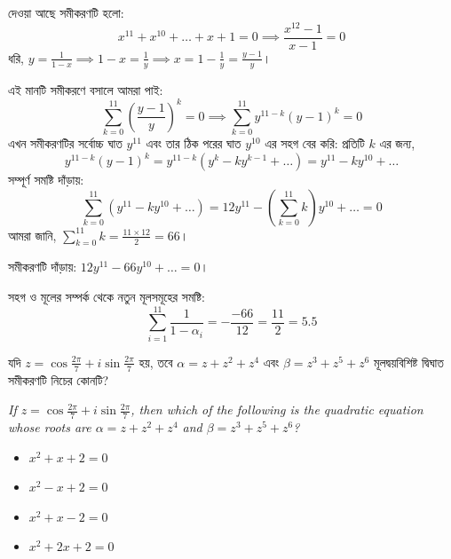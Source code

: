 \documentclass[12pt, a4paper]{article}
\begin{document}
\begin{tcolorbox}[solutionbox={সমাধান (Solution)}]
    \noindent
    দেওয়া আছে সমীকরণটি হলো: 
    \[ x^{11} + x^{10} + \dots + x + 1 = 0 \implies \frac{x^{12}-1}{x-1} = 0 \]
    ধরি, $y = \frac{1}{1-x} \implies 1-x = \frac{1}{y} \implies x = 1 - \frac{1}{y} = \frac{y-1}{y}$। 
    
    এই মানটি সমীকরণে বসালে আমরা পাই:
    \[ \sum_{k=0}^{11} \left(\frac{y-1}{y}\right)^k = 0 \implies \sum_{k=0}^{11} y^{11-k}(y-1)^k = 0 \]
    এখন সমীকরণটির সর্বোচ্চ ঘাত $y^{11}$ এবং তার ঠিক পরের ঘাত $y^{10}$ এর সহগ বের করি: প্রতিটি $k$ এর জন্য,
    \[ y^{11-k}(y-1)^k = y^{11-k}(y^k - ky^{k-1} + \dots) = y^{11} - ky^{10} + \dots \]
    সম্পূর্ণ সমষ্টি দাঁড়ায়:
    \[ \sum_{k=0}^{11} (y^{11} - ky^{10} + \dots) = 12y^{11} - \left(\sum_{k=0}^{11} k\right) y^{10} + \dots = 0 \]
    আমরা জানি, $\sum_{k=0}^{11} k = \frac{11 \times 12}{2} = 66$। 
    
    সমীকরণটি দাঁড়ায়: $12y^{11} - 66y^{10} + \dots = 0$। 
    
    সহগ ও মূলের সম্পর্ক থেকে নতুন মূলসমূহের সমষ্টি:
    \[ \sum_{i=1}^{11} \frac{1}{1-\alpha_i} = -\frac{-66}{12} = \frac{11}{2} = 5.5 \]
\end{tcolorbox}

\vspace{1em}

\begin{tcolorbox}[questionbox={প্রশ্ন (Question) 50}]
    \noindent
    যদি $z = \cos\frac{2\pi}{7} + i\sin\frac{2\pi}{7}$ হয়, তবে $\alpha = z + z^2 + z^4$ এবং $\beta = z^3 + z^5 + z^6$ মূলদ্বয়বিশিষ্ট দ্বিঘাত সমীকরণটি নিচের কোনটি?
    
    \vspace{0.8em}
    \begin{english}
    \noindent\textit{\color{darkgray}
    If $z = \cos\frac{2\pi}{7} + i\sin\frac{2\pi}{7}$, then which of the following is the quadratic equation whose roots are $\alpha = z + z^2 + z^4$ and $\beta = z^3 + z^5 + z^6$?
    }
    \end{english}
\end{tcolorbox}

\begin{itemize}[label={}, leftmargin=1cm, itemsep=0.5em]
    \item[\textbf{A)}] $x^2 + x + 2 = 0$
    \item[\textbf{B)}] $x^2 - x + 2 = 0$
    \item[\textbf{C)}] $x^2 + x - 2 = 0$
    \item[\textbf{D)}] $x^2 + 2x + 2 = 0$
\end{itemize}
\end{document}
